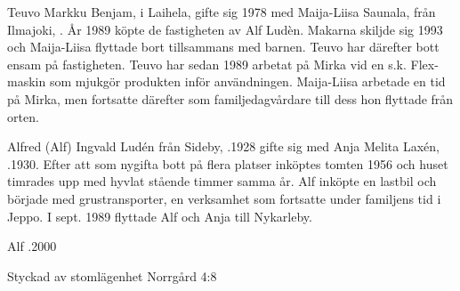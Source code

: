 
%
Teuvo Markku Benjam,  i Laihela, gifte sig 1978 med Maija-Liisa Saunala, från Ilmajoki, . År 1989 köpte de fastigheten av Alf Ludèn. Makarna skiljde sig 1993 och Maija-Liisa flyttade bort tillsammans med barnen. Teuvo har därefter bott ensam på fastigheten. Teuvo har sedan 1989 arbetat på Mirka vid en s.k. Flex-maskin som mjukgör produkten inför användningen. Maija-Liisa arbetade en tid på Mirka, men fortsatte därefter som familjedagvårdare till dess hon flyttade från orten.
\begin{jhchildren}
  \item {}
  \item {}
  \item {}
  \item {}
\end{jhchildren}


%
Alfred (Alf) Ingvald Ludén från Sideby, .1928 gifte sig med Anja Melita Laxén, .1930. Efter att som nygifta bott på flera platser inköptes tomten 1956 och huset timrades upp med hyvlat stående timmer samma år. Alf inköpte en lastbil och började med grustransporter, en verksamhet som fortsatte under familjens tid i Jeppo. I sept. 1989 flyttade Alf och Anja till Nykarleby.
\begin{jhchildren}
  \item {}
  \item {}
\end{jhchildren}
Alf .2000



%

Styckad av stomlägenhet Norrgård 4:8


%

